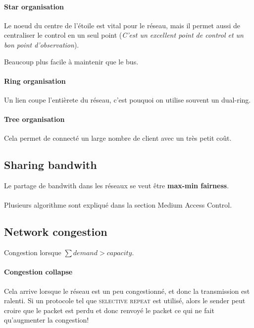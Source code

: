 \documentclass{report}
\begin{document}
\paragraph{Star organisation}
Le noeud du centre de l'étoile est vital pour le réseau, mais il permet aussi
de centraliser le control en un seul point (\textit{C'est un excellent point de 
control et un bon point d'observation}).

Beaucoup plus facile à maintenir que le bus.


\paragraph{Ring organisation}
Un lien coupe l'entièrete du réseau, c'est pouquoi on utilise souvent un dual-ring.

\paragraph{Tree organisation}
Cela permet de connecté un large nombre de client avec un très petit coût.


\subsection{Sharing bandwith}

Le partage de bandwith dans les réseaux se veut être \textbf{max-min fairness}.

\paragraph{ }Plusieurs algorithme sont expliqué dans la section Medium Access Control.

\subsection{Network congestion}

Congestion lorsque $\sum demand > capacity$.

\paragraph{Congestion collapse}
Cela arrive lorsque le réseau est un peu congestionné, et donc la transmission est ralenti.
Si un protocole tel que \textsc{selective repeat} est utilisé, alors le sender peut
croire que le packet est perdu et donc renvoyé le packet ce qui ne fait qu'augmenter
la congestion! 
\end{document}
